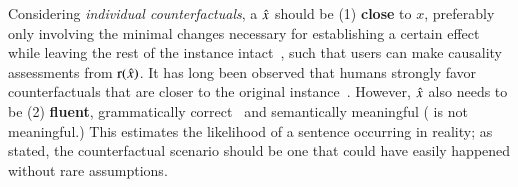 Considering \emph{individual counterfactuals}, a $\hat{x}$ should be (1) \textbf{close} to $x$, preferably only involving the minimal changes necessary for establishing a certain effect while leaving the rest of the instance intact~\cite{pearl2018causal}, such that users can make causality assessments from $\operatorname*{r}(\hat{x})$. 
It has long been observed that humans strongly favor counterfactuals that are closer to the original instance~\cite{kahneman}.
However, $\hat{x}$ also needs to be (2) \textbf{fluent}, \ie grammatically correct~\cite{morris2020textattack} and semantically meaningful (\eg {} is not meaningful.)
This estimates the likelihood of a sentence occurring in reality; as \citet{kahneman} stated, the counterfactual scenario should be one that could have easily happened without rare assumptions. 



